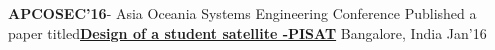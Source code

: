 \begin{cvhonors}
	\cvhonor
	{\textbf{APCOSEC'16}- Asia Oceania Systems Engineering Conference}
	{Published a paper titled\href{https://onlinelibrary.wiley.com/doi/abs/10.1002/j.2334-5837.2016.00331.x}\textbf{Design of a student satellite -PISAT}}
	{Bangalore, India}
	{Jan'16}
\end{cvhonors}

